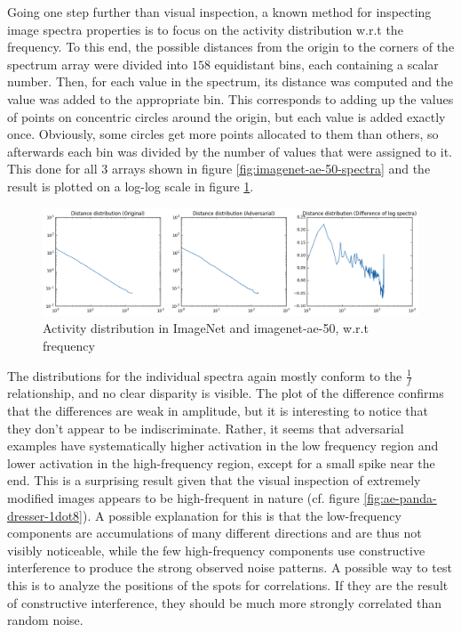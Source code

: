 \documentclass[11pt, a4paper]{article}
\begin{document}
Going one step further than visual inspection, a known method for inspecting image spectra properties is to focus on the activity distribution w.r.t the frequency. To this end, the possible distances from the origin to the corners of the spectrum array were divided into $158$ equidistant bins, each containing a scalar number. Then, for each value in the spectrum, its distance was computed and the value was added to the appropriate bin. This corresponds to adding up the values of points on concentric circles around the origin, but each value is added exactly once. Obviously, some circles get more points allocated to them than others, so afterwards each bin was divided by the number of values that were assigned to it. This done for all 3 arrays shown in figure \ref{fig:imagenet-ae-50-spectra} and the result is plotted on a log-log scale in figure \ref{fig:imagenet-ae-50-frequency}.

\begin{figure}[h!tb]
	\centering
	\includegraphics[width=\textwidth]{images/spectra/imagenet-ae-50-minconfidence-0dot5-maxorig-20000-distance-158-bins.png}
	\caption{Activity distribution in ImageNet and imagenet-ae-50, w.r.t frequency}
	\label{fig:imagenet-ae-50-frequency}
\end{figure}

The distributions for the individual spectra again mostly conform to the $\frac{1}{f}$ relationship, and no clear disparity is visible. The plot of the difference confirms that the differences are weak in amplitude, but it is interesting to notice that they don't appear to be indiscriminate. Rather, it seems that adversarial examples have systematically higher activation in the low frequency region and lower activation in the high-frequency region, except for a small spike near the end. This is a surprising result given that the visual inspection of extremely modified images appears to be high-frequent in nature (cf. figure \ref{fig:ae-panda-dresser-1dot8}). A possible explanation for this is that the low-frequency components are accumulations of many different directions and are thus not visibly noticeable, while the few high-frequency components use constructive interference to produce the strong observed noise patterns. A possible way to test this is to analyze the positions of the spots for correlations. If they are the result of constructive interference, they should be much more strongly correlated than random noise.
\end{document}
